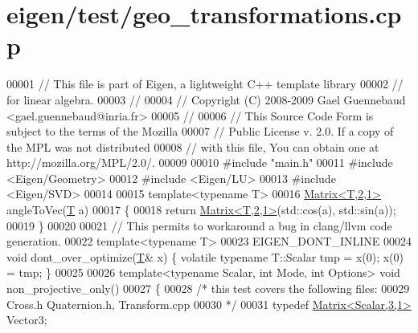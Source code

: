\hypertarget{eigen_2test_2geo__transformations_8cpp_source}{}\section{eigen/test/geo\+\_\+transformations.cpp}
\label{eigen_2test_2geo__transformations_8cpp_source}

\begin{DoxyCode}
00001 \textcolor{comment}{// This file is part of Eigen, a lightweight C++ template library}
00002 \textcolor{comment}{// for linear algebra.}
00003 \textcolor{comment}{//}
00004 \textcolor{comment}{// Copyright (C) 2008-2009 Gael Guennebaud <gael.guennebaud@inria.fr>}
00005 \textcolor{comment}{//}
00006 \textcolor{comment}{// This Source Code Form is subject to the terms of the Mozilla}
00007 \textcolor{comment}{// Public License v. 2.0. If a copy of the MPL was not distributed}
00008 \textcolor{comment}{// with this file, You can obtain one at http://mozilla.org/MPL/2.0/.}
00009 
00010 \textcolor{preprocessor}{#include "main.h"}
00011 \textcolor{preprocessor}{#include <Eigen/Geometry>}
00012 \textcolor{preprocessor}{#include <Eigen/LU>}
00013 \textcolor{preprocessor}{#include <Eigen/SVD>}
00014 
00015 \textcolor{keyword}{template}<\textcolor{keyword}{typename} T>
00016 \hyperlink{group___core___module_class_eigen_1_1_matrix}{Matrix<T,2,1>} angleToVec(\hyperlink{group___sparse_core___module_class_eigen_1_1_triplet}{T} a)
00017 \{
00018   \textcolor{keywordflow}{return} \hyperlink{group___core___module_class_eigen_1_1_matrix}{Matrix<T,2,1>}(std::cos(a), std::sin(a));
00019 \}
00020 
00021 \textcolor{comment}{// This permits to workaround a bug in clang/llvm code generation.}
00022 \textcolor{keyword}{template}<\textcolor{keyword}{typename} T>
00023 EIGEN\_DONT\_INLINE
00024 \textcolor{keywordtype}{void} dont\_over\_optimize(\hyperlink{group___sparse_core___module_class_eigen_1_1_triplet}{T}& x) \{ \textcolor{keyword}{volatile} \textcolor{keyword}{typename} T::Scalar tmp = x(0); x(0) = tmp; \}
00025 
00026 \textcolor{keyword}{template}<\textcolor{keyword}{typename} Scalar, \textcolor{keywordtype}{int} Mode, \textcolor{keywordtype}{int} Options> \textcolor{keywordtype}{void} non\_projective\_only()
00027 \{
00028     \textcolor{comment}{/* this test covers the following files:}
00029 \textcolor{comment}{     Cross.h Quaternion.h, Transform.cpp}
00030 \textcolor{comment}{  */}
00031   \textcolor{keyword}{typedef} \hyperlink{group___core___module}{Matrix<Scalar,3,1>} Vector3;

\end{DoxyCode}
